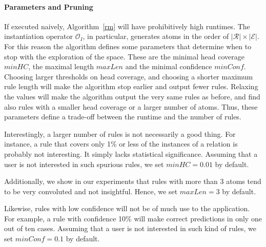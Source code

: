 \paragraph{Parameters and Pruning}
If executed naively, Algorithm~\ref{rm} will have prohibitively high runtimes.
The instantiation operator $\mathcal{O}_I$, in particular, generates atoms in the order of $|\mathcal{R}| \times |\mathcal{E}|$.
For this reason the algorithm defines some parameters that determine when to stop with the exploration of the space.
These are the minimal head coverage $minHC$, the maximal length $maxLen$ and the minimal confidence $minConf$.
Choosing larger thresholds on head coverage, and choosing a shorter maximum rule length will make the algorithm stop earlier
and output fewer rules. Relaxing the values will make the algorithm output the very same rules as before,
and find also rules with a smaller head coverage or a larger number of atoms.
Thus, these parameters define a trade-off between the runtime and the number of rules.

Interestingly, a larger number of rules is not necessarily a good thing.
For instance, a rule that covers only 1\% or less of the instances of a relation is probably not interesting. It simply lacks statistical significance. Assuming that a user is not interested in such spurious rules, we set $minHC=0.01$ by default.

Additionally, we show in our experiments that rules with more than 3 atoms tend to be very convoluted and not insightful. Hence, we set $maxLen=3$ by default.


Likewise, rules with low confidence will not be of much use to the application. For example, a rule with confidence 10\% will make correct predictions in only one out of
ten cases. Assuming that a user is not interested in such kind of rules, we set $minConf=0.1$ by default.

